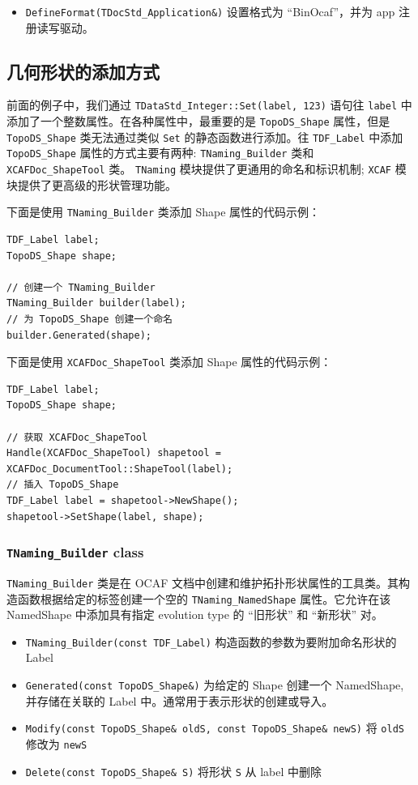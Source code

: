 \documentclass[11pt]{article}
\begin{document}
\begin{itemize}
\item \texttt{DefineFormat(TDocStd\_Application\&)} 设置格式为 ``BinOcaf''，并为 app 注册读写驱动。
\end{itemize}
\subsection{几何形状的添加方式}
\label{sec:orgce993a8}

前面的例子中，我们通过 \texttt{TDataStd\_Integer::Set(label, 123)} 语句往 \texttt{label} 中添加了一个整数属性。在各种属性中，最重要的是 \texttt{TopoDS\_Shape} 属性，但是 \texttt{TopoDS\_Shape} 类无法通过类似 \texttt{Set} 的静态函数进行添加。往 \texttt{TDF\_Label} 中添加 \texttt{TopoDS\_Shape} 属性的方式主要有两种: \texttt{TNaming\_Builder} 类和 \texttt{XCAFDoc\_ShapeTool} 类。 \texttt{TNaming} 模块提供了更通用的命名和标识机制; \texttt{XCAF} 模块提供了更高级的形状管理功能。

下面是使用 \texttt{TNaming\_Builder} 类添加 Shape 属性的代码示例：

\begin{verbatim}
TDF_Label label;
TopoDS_Shape shape;

// 创建一个 TNaming_Builder
TNaming_Builder builder(label);
// 为 TopoDS_Shape 创建一个命名
builder.Generated(shape);
\end{verbatim}

下面是使用 \texttt{XCAFDoc\_ShapeTool} 类添加 Shape 属性的代码示例：

\begin{verbatim}
TDF_Label label;
TopoDS_Shape shape;

// 获取 XCAFDoc_ShapeTool
Handle(XCAFDoc_ShapeTool) shapetool = XCAFDoc_DocumentTool::ShapeTool(label);
// 插入 TopoDS_Shape
TDF_Label label = shapetool->NewShape();
shapetool->SetShape(label, shape);
\end{verbatim}
\subsubsection{\texttt{TNaming\_Builder} class}
\label{sec:org22f9bae}

\texttt{TNaming\_Builder} 类是在 OCAF 文档中创建和维护拓扑形状属性的工具类。其构造函数根据给定的标签创建一个空的 \texttt{TNaming\_NamedShape} 属性。它允许在该 NamedShape 中添加具有指定 evolution type 的 ``旧形状'' 和 ``新形状'' 对。

\begin{itemize}
\item \texttt{TNaming\_Builder(const TDF\_Label)} 构造函数的参数为要附加命名形状的 Label
\item \texttt{Generated(const TopoDS\_Shape\&)} 为给定的 Shape 创建一个 NamedShape, 并存储在关联的 Label 中。通常用于表示形状的创建或导入。
\item \texttt{Modify(const TopoDS\_Shape\& oldS, const TopoDS\_Shape\& newS)} 将 \texttt{oldS} 修改为 \texttt{newS}
\item \texttt{Delete(const TopoDS\_Shape\& S)} 将形状 \texttt{S} 从 label 中删除
\end{itemize}
\end{document}
